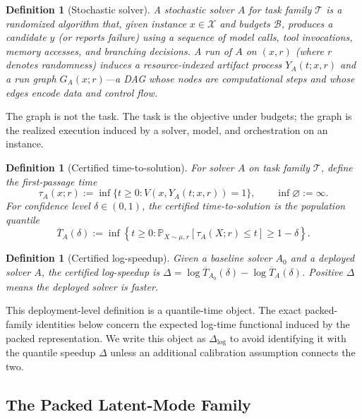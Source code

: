 \documentclass[10pt]{article}
\theoremstyle{paperplain}
\theoremstyle{paperdefinition}
\newtheorem{definition}[theorem]{Definition}
\theoremstyle{paperremark}
\newcommand{\Prb}{\mathbb{P}}
\newcommand{\cX}{\mathcal{X}}
\newcommand{\cT}{\mathcal{T}}
\newcommand{\cB}{\mathcal{B}}
\newcommand{\Dlog}{\Delta_{\log}}
\begin{document}
\begin{definition}[Stochastic solver]
\label{def:solver}
A \emph{stochastic solver} $A$ for task family $\cT$ is a randomized algorithm that, given instance $x \in \cX$ and budgets $\cB$, produces a candidate $y$ (or reports failure) using a sequence of model calls, tool invocations, memory accesses, and branching decisions.
A run of $A$ on $(x,r)$ (where $r$ denotes randomness) induces a resource-indexed artifact process $Y_A(t;x,r)$ and a \emph{run graph} $G_A(x;r)$---a DAG whose nodes are computational steps and whose edges encode data and control flow.
\end{definition}

The graph is not the task. The task is the objective under budgets; the graph is the realized execution induced by a solver, model, and orchestration on an instance.

\begin{definition}[Certified time-to-solution]
\label{def:certified-time}
For solver $A$ on task family $\cT$, define the first-passage time
\[
\tau_A(x;r):=\inf\{t\ge 0:V(x,Y_A(t;x,r))=1\},
\qquad \inf\varnothing:=\infty.
\]
For confidence level $\delta \in (0,1)$, the \emph{certified time-to-solution} is the population quantile
\[
\overline{T}_A(\delta)
:=
\inf\!\left\{t\ge 0:
\Prb_{X\sim\mu,r}[\tau_A(X;r)\le t]\ge 1-\delta
\right\}.
\]
\end{definition}

\begin{definition}[Certified log-speedup]
\label{def:speedup}
Given a baseline solver $A_0$ and a deployed solver $A$, the certified log-speedup is $\Delta = \log \overline{T}_{A_0}(\delta) - \log \overline{T}_A(\delta)$.
Positive $\Delta$ means the deployed solver is faster.
\end{definition}

This deployment-level definition is a quantile-time object. The exact packed-family identities below concern the expected log-time functional induced by the packed representation. We write this object as $\Dlog$ to avoid identifying it with the quantile speedup $\Delta$ unless an additional calibration assumption connects the two.

\subsection{The Packed Latent-Mode Family}
\label{subsec:packed-family-def}
\end{document}
